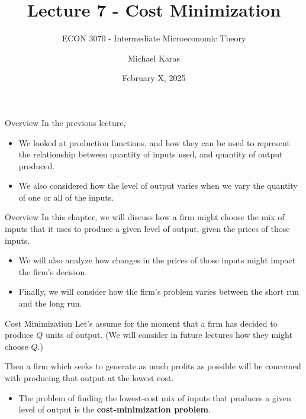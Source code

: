 \documentclass[11pt,t]{beamer}
\author{Michael Karas}
\title{Lecture 7  - Cost Minimization}
\subtitle{ECON 3070 - Intermediate Microeconomic Theory}
\date{February X, 2025}
\begin{document}
\begin{frame}
  \titlepage
\end{frame}

\begin{frame}{Overview}
  In the previous lecture,

  \begin{itemize}
    \item We looked at production functions, and how they can be used to represent the relationship between quantity of inputs used, and quantity of output produced.

    \item We also considered how the level of output varies when we vary the quantity of one or all of the inputs.
  \end{itemize}
\end{frame}

\begin{frame}{Overview}
  In this chapter, we will discuss how a firm might choose the mix of inputs that it uses to produce a given level of output, given the prices of those inputs.

  \begin{itemize}
    \item We will also analyze how changes in the prices of those inputs might impact the firm's decision.

    \item Finally, we will consider how the firm's problem varies between the short run and the long run.
  \end{itemize}
\end{frame}


\begin{frame}{Cost Minimization}
  Let's assume for the moment that a firm has decided to produce $Q$ units of output. (We will consider in future lectures how they might choose $Q$.)

  \bigskip
  Then a firm which seeks to generate as much profits as possible will be concerned with producing that output at the lowest cost.

  \pause\bigskip
  \begin{itemize}
    \item The problem of finding the lowest-cost mix of inputs that produces a given level of output is the \textbf{cost-minimization problem}.
  \end{itemize}
\end{frame}
\end{document}
